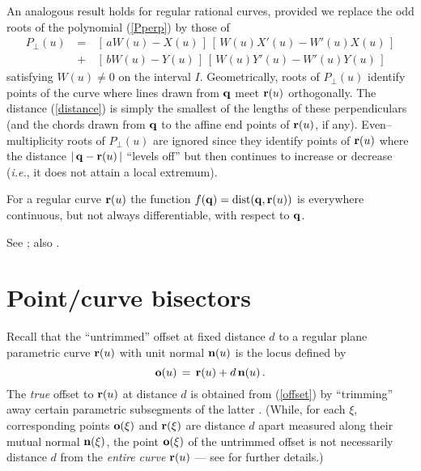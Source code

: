 An analogous result holds for regular rational curves, provided we
replace the odd roots of the polynomial (\ref{Pperp}) by those of
\begin{eqnarray} \label{Rperp}
P_\perp(u)
&\,=\,& [\,aW(u)-X(u)\,]\,[\,W(u)X'(u)-W'(u)X(u)\,] \nonumber \\
&\,+\,& [\,bW(u)-Y(u)\,]\,[\,W(u)Y'(u)-W'(u)Y(u)\,]
\end{eqnarray}
satisfying $W(u)\not=0$ on the interval $I$. Geometrically,
roots of $P_\perp(u)$ identify points of the curve where lines
drawn from ${\bf q}$ meet ${\bf r}(u)$ orthogonally. The distance
(\ref{distance}) is simply the smallest of the lengths of these
perpendiculars (and the chords drawn from ${\bf q}$ to the affine
end points of ${\bf r}(u)$, if any). Even--multiplicity roots of
$P_\perp(u)$ are ignored since they identify points of ${\bf r}(u)$
where the distance $|\,{\bf q}-{\bf r}(u)\,|$ ``levels off'' but
then continues to increase or decrease ({\it i.e.}, it does not
attain a local extremum).

\begin{propn} {\rm
For a regular curve ${\bf r}(u)$ the function $f({\bf q})=
{\rm dist}({\bf q},{\bf r}(u))$ is everywhere continuous, but
not always differentiable, with respect to ${\bf q}$. }
\end{propn}

\prf See \cite[Proposition~1.2]{farouki91b}; also \cite{kelly79}.
\QED

\section{Point/curve bisectors}

Recall \cite{farouki90a,farouki90b} that the ``untrimmed'' offset
at fixed distance $d$ to a regular plane parametric curve ${\bf r}
(u)$ with unit normal ${\bf n}(u)$ is the locus defined by
\begin{equation} \label{offset}
{\bf o}(u) \,=\, {\bf r}(u) + d\,{\bf n}(u) \,.
\end{equation}
The {\it true\/} offset to ${\bf r}(u)$ at distance $d$ is
obtained from (\ref{offset}) by ``trimming'' away certain parametric
subsegments of the latter \cite{farouki90a,farouki90b}. (While, for
each $\xi$, corresponding points ${\bf o}(\xi)$ and ${\bf r}(\xi)$
are distance $d$ apart measured along their mutual normal ${\bf n}
(\xi)$, the point ${\bf o}(\xi)$ of the untrimmed offset is not
necessarily distance $d$ from the {\it entire curve\/} ${\bf r}(u)$
--- see \cite{farouki90a,farouki90b} for further details.)


